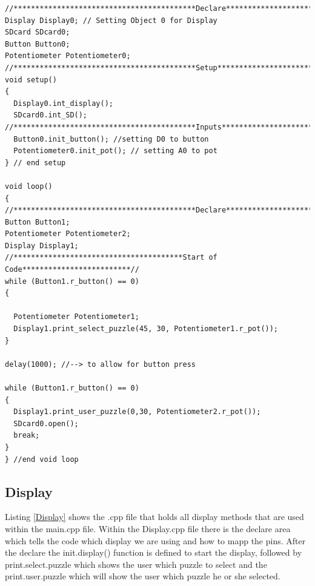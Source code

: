 \documentclass[11pt]{article}
\begin{document}
\begin{lstlisting}[caption={Puzzle me Chess - main.cpp file},label={main}]
//******************************************Declare****************************//
Display Display0; // Setting Object 0 for Display
SDcard SDcard0; 
Button Button0;
Potentiometer Potentiometer0; 
//******************************************Setup******************************//
void setup()
{
  Display0.int_display();
  SDcard0.int_SD();
//******************************************Inputs*****************************//
  Button0.init_button(); //setting D0 to button
  Potentiometer0.init_pot(); // setting A0 to pot
} // end setup

void loop()
{
//******************************************Declare****************************//
Button Button1;
Potentiometer Potentiometer2;
Display Display1;
//***************************************Start of Code*************************//
while (Button1.r_button() == 0)
{
  
  Potentiometer Potentiometer1; 
  Display1.print_select_puzzle(45, 30, Potentiometer1.r_pot());
}

delay(1000); //--> to allow for button press

while (Button1.r_button() == 0)
{
  Display1.print_user_puzzle(0,30, Potentiometer2.r_pot());
  SDcard0.open();
  break;
}
} //end void loop
\end{lstlisting}

\subsection{Display}
Listing \ref{Display} shows the .cpp file that holds all display methods that are used within the main.cpp file. Within the Display.cpp file there is the declare area which tells the code which display we are using and how to mapp the pins. After the declare the init.display() function is defined to start the display, followed by print.select.puzzle which shows the user which puzzle to select and the print.user.puzzle which will show the user which puzzle he or she selected. 
\end{document}
